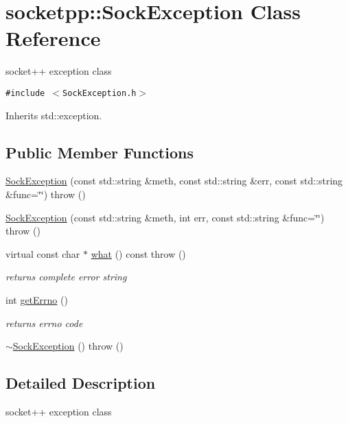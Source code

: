 \hypertarget{classsocketpp_1_1SockException}{
\section{socketpp::SockException Class Reference}
\label{classsocketpp_1_1SockException}
}
socket++ exception class  


{\tt \#include $<$SockException.h$>$}

Inherits std::exception.

\subsection*{Public Member Functions}
\begin{CompactItemize}
\item 
\hyperlink{classsocketpp_1_1SockException_ea2b065bb1b5c6bf062b6a9d7574853f}{SockException} (const std::string \&meth, const std::string \&err, const std::string \&func=\char`\"{}\char`\"{})  throw ()
\item 
\hyperlink{classsocketpp_1_1SockException_b83e8ced6e6fa142711d0a49e3e70ba0}{SockException} (const std::string \&meth, int err, const std::string \&func=\char`\"{}\char`\"{})  throw ()
\item 
virtual const char $\ast$ \hyperlink{classsocketpp_1_1SockException_5c15a1c818818042230d017d924ef9ea}{what} () const   throw ()
\begin{CompactList}\small\item\em returns complete error string \item\end{CompactList}\item 
int \hyperlink{classsocketpp_1_1SockException_cc8b24550b7a77c5f710a6abaff6e696}{getErrno} ()
\begin{CompactList}\small\item\em returns errno code \item\end{CompactList}\item 
\hyperlink{classsocketpp_1_1SockException_5ab9299ca51c12d5d1a62d7872003b84}{$\sim$SockException} ()  throw ()
\end{CompactItemize}


\subsection{Detailed Description}
socket++ exception class 

